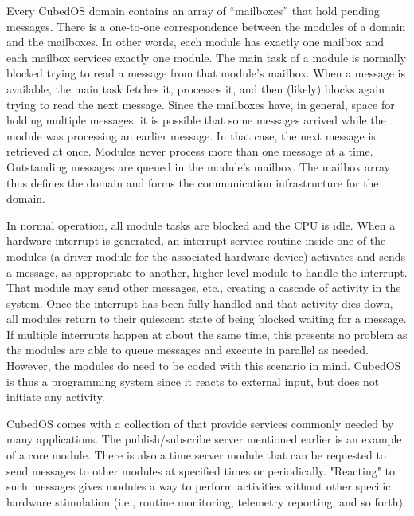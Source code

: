 \documentclass{scrreprt}
\begin{document}
Every CubedOS domain contains an array of ``mailboxes'' that hold pending messages. There is a one-to-one correspondence between the modules of a domain and the mailboxes. In other words, each module has exactly one mailbox and each mailbox services exactly one module. The main task of a module is normally blocked trying to read a message from that module's mailbox. When a message is available, the main task fetches it, processes it, and then (likely) blocks again trying to read the next message. Since the mailboxes have, in general, space for holding multiple messages, it is possible that some messages arrived while the module was processing an earlier message. In that case, the next message is retrieved at once. Modules never process more than one message at a time. Outstanding messages are queued in the module's mailbox. The mailbox array thus defines the domain and forms the communication infrastructure for the domain.

In normal operation, all module tasks are blocked and the CPU is idle. When a hardware interrupt is generated, an interrupt service routine inside one of the modules (a driver module for the associated hardware device) activates and sends a message, as appropriate to another, higher-level module to handle the interrupt. That module may send other messages, etc., creating a cascade of activity in the system. Once the interrupt has been fully handled and that activity dies down, all modules return to their quiescent state of being blocked waiting for a message. If multiple interrupts happen at about the same time, this presents no problem as the modules are able to queue messages and execute in parallel as needed. However, the modules do need to be coded with this scenario in mind. CubedOS is thus a  programming system since it reacts to external input, but does not initiate any activity.

CubedOS comes with a collection of  that provide services commonly needed by many applications. The publish/subscribe server mentioned earlier is an example of a core module. There is also a time server module that can be requested to send messages to other modules at specified times or periodically. "Reacting" to such messages gives modules a way to perform activities without other specific hardware stimulation (i.e., routine monitoring, telemetry reporting, and so forth).
\end{document}

